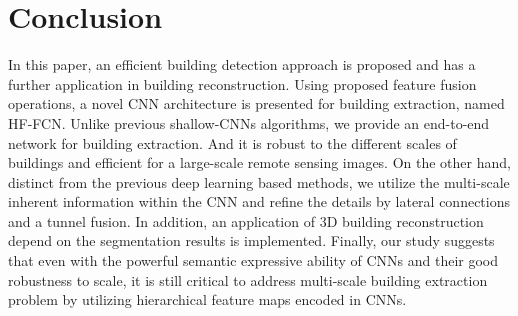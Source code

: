 \section{Conclusion}
\label{Sec:Con}
 In this paper, an efficient building detection approach is proposed and has a further application in building reconstruction.
 Using proposed feature fusion operations, a novel CNN architecture is presented for building extraction, named HF-FCN.
 Unlike previous shallow-CNNs algorithms, we provide an end-to-end network for building extraction.
 And it is robust to the different scales of buildings and efficient for a large-scale remote sensing images.
 On the other hand, distinct from the previous deep learning based methods, we utilize the multi-scale inherent information within the CNN and refine the details by lateral connections and a tunnel fusion.
 In addition, an application of 3D building reconstruction depend on the segmentation results is implemented.
 Finally, our study suggests that even with the powerful semantic expressive ability of CNNs and their good robustness to scale, it is still critical to address multi-scale building extraction problem by utilizing hierarchical feature maps encoded in CNNs.

